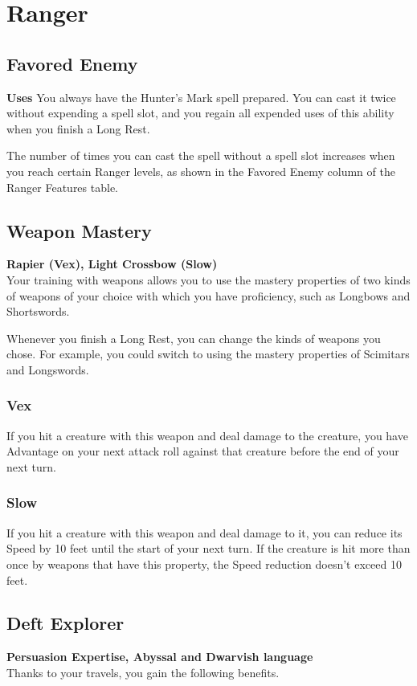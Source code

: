 \documentclass[letterpaper,openany,oneside,twocolumn]{book}
\begin{document}
\section*{Ranger}
\subsection*{Favored Enemy}
\textbf{ Uses}
You always have the Hunter's Mark spell prepared. You can cast it twice without expending a spell slot, and you regain all expended uses of this ability when you finish a Long Rest.

The number of times you can cast the spell without a spell slot increases when you reach certain Ranger levels, as shown in the Favored Enemy column of the Ranger Features table.
\subsection*{Weapon Mastery}
\textbf{Rapier (Vex), Light Crossbow (Slow)}\\
Your training with weapons allows you to use the mastery properties of two kinds of weapons of your choice with which you have proficiency, such as Longbows and Shortswords.

Whenever you finish a Long Rest, you can change the kinds of weapons you chose. For example, you could switch to using the mastery properties of Scimitars and Longswords.
\subsubsection*{Vex}
If you hit a creature with this weapon and deal damage to the creature, you have Advantage on your next attack roll against that creature before the end of your next turn.
\subsubsection*{Slow}
If you hit a creature with this weapon and deal damage to it, you can reduce its Speed by 10 feet until the start of your next turn. If the creature is hit more than once by weapons that have this property, the Speed reduction doesn't exceed 10 feet.
\subsection*{Deft Explorer}
\textbf{Persuasion Expertise, Abyssal and Dwarvish language}\\
Thanks to your travels, you gain the following benefits.
\end{document}
